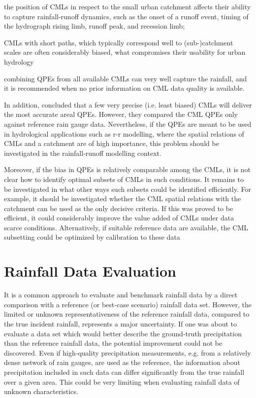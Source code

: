 \documentclass{ctuthesis}\usepackage[]{graphicx}\usepackage[]{color}
\begin{document}
the position of CMLs in respect to the small urban catchment affects their ability to capture rainfall-runoff dynamics, such as the onset of a runoff event, timing of the hydrograph rising limb, runoff peak, and recession limb;

CMLs with short paths, which typically correspond well to (sub-)catchment scales are often considerably biased, what compromises their usability for urban hydrology

combining QPEs from all available CMLs can very well capture the rainfall, and it is recommended when no prior information on CML data quality is available.

In addition, \cite{fenclCommercialMicrowaveLinks2015} concluded that a few very precise (i.e. least biased) CMLs will deliver the most accurate areal QPEs. However, they compared the CML QPEs only against reference rain gauge data. Nevertheless, if the QPEs are meant to be used in hydrological applications such as r-r modelling, where the spatial relations of CMLs and a catchment are of high importance, this problem should be investigated in the rainfall-runoff modelling context.

Moreover, if the bias in QPEs is relatively comparable among the CMLs, it is not clear how to identify optimal subsets of CMLs in such conditions. It remains to be investigated in what other ways such subsets could be identified efficiently. 
For example, it should be investigated whether the CML spatial relations with the catchment can be used as the only decisive criteria. If this was proved to be efficient, it could considerably improve the value added of CMLs under data scarce conditions.
Alternatively, if suitable reference data are available, the CML subsetting could be optimized by calibration to these data




\section{Rainfall Data Evaluation}

It is a common approach \citep[e.g.][]{fenclCommercialMicrowaveLinks2015, fenclGaugeadjustedRainfallEstimates2017, riosgaonaMeasurementInterpolationUncertainties2015, grafRainfallEstimationGermanwide2020} to evaluate and benchmark rainfall data by a direct comparison with a reference (or best‐case scenario) rainfall data set. However, the limited or unknown representativeness of the reference rainfall data, compared to the true incident rainfall, represents a major uncertainty. If one was about to evaluate a data set which would better describe the ground‐truth precipitation than the reference rainfall data, the potential improvement could not be discovered. Even if high‐quality precipitation measurements, e.g. from a relatively dense network of rain gauges, are used as the reference, the information about precipitation included in such data can differ significantly from the true rainfall over a given area. This could be very limiting when evaluating rainfall data of unknown characteristics.
\end{document}
